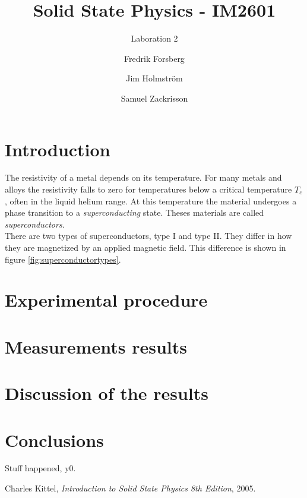 \documentclass[a4paper,twoside=false,abstract=false,numbers=noenddot,
titlepage=false,headings=small,parskip=half,version=last]{scrartcl}
\title{Solid State Physics - IM2601}
\subtitle{Laboration 2}
\author[1]{Fredrik Forsberg}
\author[1]{Jim Holmström}
\author[1]{Samuel Zackrisson}
\affil[1]{Engineering Physics, Royal Institute of Technology}
\affil[1]{\{fforsber, jimho, samuelz\}@kth.se}
\begin{document}
\maketitle
\thispagestyle{empty}

\section{Introduction}
The resistivity of a metal depends on its temperature. For many metals and alloys the resistivity falls to zero for temperatures below a critical temperature $T_c$, often in the liquid helium range. At this temperature the material undergoes a phase transition to a \emph{superconducting} state. Theses materials are called \emph{superconductors}.\\
There are two types of superconductors, type I and type II. They differ in how they are magnetized by an applied magnetic field. This difference is shown in figure \ref{fig:superconductortypes}.


\section{Experimental procedure}

\section{Measurements results}

\section{Discussion of the results}

\section{Conclusions}
Stuff happened, y0.

\begin{thebibliography}{1}
        Charles Kittel,
        {\em Introduction to Solid State Physics 8th Edition},
        2005.
\end{thebibliography}
\end{document}
